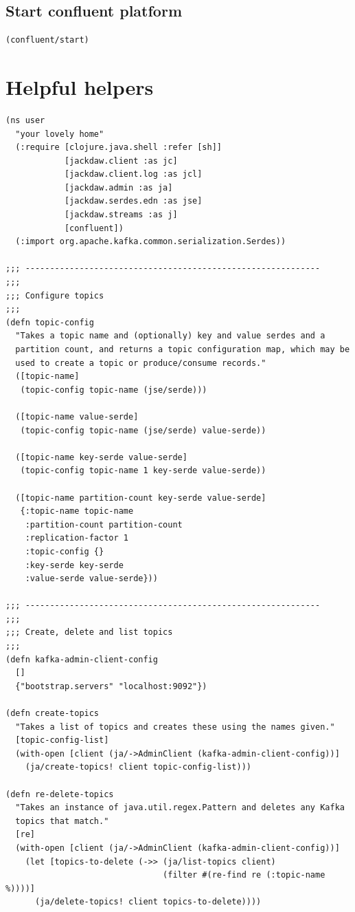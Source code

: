 \documentclass[11pt]{article}
\begin{document}
\subsection{Start confluent platform}
\label{sec:org67d4751}
\begin{verbatim}
(confluent/start)
\end{verbatim}
\section{Helpful helpers}
\label{sec:org5a7b76a}

\begin{verbatim}
(ns user
  "your lovely home"
  (:require [clojure.java.shell :refer [sh]]
            [jackdaw.client :as jc]
            [jackdaw.client.log :as jcl]
            [jackdaw.admin :as ja]
            [jackdaw.serdes.edn :as jse]
            [jackdaw.streams :as j]
            [confluent])
  (:import org.apache.kafka.common.serialization.Serdes))

;;; ------------------------------------------------------------
;;;
;;; Configure topics
;;;
(defn topic-config
  "Takes a topic name and (optionally) key and value serdes and a
  partition count, and returns a topic configuration map, which may be
  used to create a topic or produce/consume records."
  ([topic-name]
   (topic-config topic-name (jse/serde)))

  ([topic-name value-serde]
   (topic-config topic-name (jse/serde) value-serde))

  ([topic-name key-serde value-serde]
   (topic-config topic-name 1 key-serde value-serde))

  ([topic-name partition-count key-serde value-serde]
   {:topic-name topic-name
    :partition-count partition-count
    :replication-factor 1
    :topic-config {}
    :key-serde key-serde
    :value-serde value-serde}))

;;; ------------------------------------------------------------
;;;
;;; Create, delete and list topics
;;;
(defn kafka-admin-client-config
  []
  {"bootstrap.servers" "localhost:9092"})

(defn create-topics
  "Takes a list of topics and creates these using the names given."
  [topic-config-list]
  (with-open [client (ja/->AdminClient (kafka-admin-client-config))]
    (ja/create-topics! client topic-config-list)))

(defn re-delete-topics
  "Takes an instance of java.util.regex.Pattern and deletes any Kafka
  topics that match."
  [re]
  (with-open [client (ja/->AdminClient (kafka-admin-client-config))]
    (let [topics-to-delete (->> (ja/list-topics client)
                                (filter #(re-find re (:topic-name %))))]
      (ja/delete-topics! client topics-to-delete))))


\end{verbatim}
\end{document}
